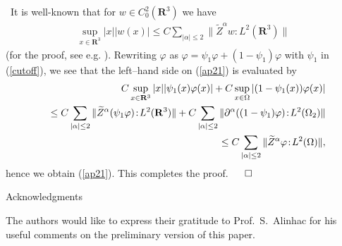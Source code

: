\documentclass[12pt]{amsart}
\newcommand{\R}{{\mathbf R}}
\numberwithin{equation}{section}
\begin{document}
\vspace{2mm}

\ It is well-known that for $w \in
C_0^2(\R^3)$ we have
\begin{eqnarray}\nonumber
\sup_{x \in \R^3} |x||w(x)| \le C \sum_{|\alpha| \le 2}
\|\widetilde{Z}^\alpha w\!:\!{L^2(\R^3)}\|
\end{eqnarray}
(for the proof, see e.g. \cite{kl0}). Rewriting $\varphi$ as
$\varphi=\psi_1 \varphi+(1-\psi_1) \varphi$ with $\psi_1$ in (\ref{cutoff}), we see that the left--hand side on
(\ref{ap21}) is evaluated by
\begin{eqnarray}\nonumber
&& \hspace{4mm}
 C \sup_{x \in \R^3} |x| |\psi_1(x) \varphi(x)|
+C \sup_{x \in \Omega} |(1-\psi_1(x)) \varphi(x)|
\\ \nonumber
&&  \le
 C \sum_{|\alpha| \le 2} \|\widetilde{Z}^\alpha (\psi_1 \varphi)\!:\!{L^2(\R^3)}\|
+C \sum_{|\alpha| \le 2} \|\partial^\alpha ((1-\psi_1) \varphi)\!:\!{L^2(\Omega_2)}\|
\\ \nonumber
&&  \le C \sum_{|\alpha| \le 2} \|\widetilde{Z}^\alpha \varphi\!:\!{L^2(\Omega)}\|,
\end{eqnarray}
hence we obtain (\ref{ap21}). This completes the proof.
\hfill$\qed$
\medskip\\
\begin{center}
{\sc Acknowledgments}
\end{center}
The authors would like to express their gratitude to
Prof.~S.~Alinhac for his useful comments on 
the preliminary version of this paper.
\end{document}
